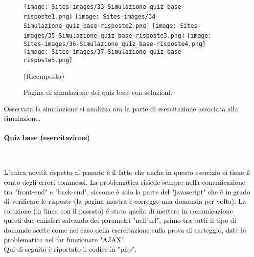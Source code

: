 \begin{minipage}{\textwidth}
\begin{figure}[H]
	\begin{center}
		\texttt{[image: Sites-images/33-Simulazione\_quiz\_base-risposte1.png]}
		\texttt{[image: Sites-images/34-Simulazione\_quiz\_base-risposte2.png]}
		\texttt{[image: Sites-images/35-Simulazione\_quiz\_base-risposte3.png]}
		\texttt{[image: Sites-images/36-Simulazione\_quiz\_base-risposte4.png]}
		\texttt{[image: Sites-images/37-Simulazione\_quiz\_base-risposte5.png]}
		\caption{Pagina di simulazione dei quiz base con soluzioni.}
		(Ricomposta)
	\end{center}
\end{figure}
\end{minipage}

\textcolor{black}{Osservata la simulazione si analizza ora la parte di esercitazione associata alla simulazione.}\\

\paragraph{\textcolor{black}{Quiz base (esercitazione)}}\leavevmode\\
\raggedright
\textcolor{black}{L'unica novità rispetto al passato è il fatto che anche in questo esercizio si tiene il conto degli errori commessi. La problematica risiede sempre nella comunicazione tra "front-end" e "back-end", siccome è solo la parte del "javascript" che è in grado di verificare le risposte (la pagina mostra e corregge una domanda per volta). La soluzione (in linea con il passato) è stata quella di mettere in comunicazione questi due emisferi salvando dei parametri "nell'url", primo tra tutti il tipo di domande scelte come nel caso della esercitazione sulla prova di carteggio, date le problematica nel far funzionare "AJAX".\\
Qui di seguito è riportato il codice in "php".}\\

